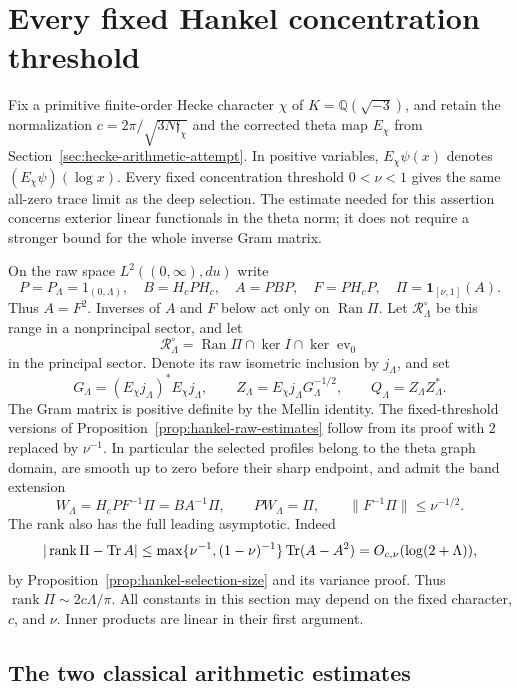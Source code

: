 \section{Every fixed Hankel concentration threshold}
\label{nh:section}

Fix a primitive finite-order Hecke character $\chi$ of
$K=\mathbb Q(\sqrt{-3})$, and retain the normalization
$c=2\pi/\sqrt{3N\mathfrak f_\chi}$ and the corrected theta map
$E_\chi$ from Section~\ref{sec:hecke-arithmetic-attempt}.
In positive variables, $E_\chi\psi(x)$ denotes
$(E_\chi\psi)(\log x)$.
Every fixed concentration threshold $0<\nu<1$ gives the same
all-zero trace limit as the deep selection. The estimate needed
for this assertion concerns exterior linear functionals in the
theta norm; it does not require a stronger bound for the whole
inverse Gram matrix.

On the raw space $L^2((0,\infty),du)$ write
\[
 P=P_\Lambda=1_{(0,\Lambda)},\quad
 B=H_cPH_c,\quad A=PBP,\quad F=PH_cP,\quad
 \Pi=\mathbf1_{[\nu,1]}(A).
\]
Thus $A=F^2$. Inverses of $A$ and $F$ below act only on
$\operatorname{Ran}\Pi$. Let $\mathcal R_\Lambda^\circ$ be this
range in a nonprincipal sector, and let
\[
 \mathcal R_\Lambda^\circ
 =\operatorname{Ran}\Pi\cap\ker I\cap\ker\operatorname{ev}_0
\]
in the principal sector. Denote its raw isometric inclusion by
$j_\Lambda$, and set
\[
 G_\Lambda=(E_\chi j_\Lambda)^*E_\chi j_\Lambda,\qquad
 Z_\Lambda=E_\chi j_\Lambda G_\Lambda^{-1/2},\qquad
 Q_\Lambda=Z_\Lambda Z_\Lambda^*.
\]
The Gram matrix is positive definite by the Mellin identity.
The fixed-threshold versions of
Proposition~\ref{prop:hankel-raw-estimates} follow from its proof
with $2$ replaced by $\nu^{-1}$. In particular the selected
profiles belong to the theta graph domain, are smooth up to zero
before their sharp endpoint, and admit the band extension
\begin{equation}\label{nh:extension}
 W_\Lambda=H_cPF^{-1}\Pi=BA^{-1}\Pi,\qquad
 PW_\Lambda=\Pi,\qquad \|F^{-1}\Pi\|\leq\nu^{-1/2}.
\end{equation}
The rank also has the full leading asymptotic. Indeed
\[
 |\operatorname{rank}\Pi-\operatorname{Tr} A|
 \leq\max\{\nu^{-1},(1-\nu)^{-1}\}\operatorname{Tr}(A-A^2)
 =O_{c,\nu}(\log(2+\Lambda)),
\]
by Proposition~\ref{prop:hankel-selection-size} and its variance proof.
Thus $\operatorname{rank}\Pi\sim2c\Lambda/\pi$.
All constants in this section may depend on the fixed character,
$c$, and $\nu$. Inner products are linear in their first argument.

\subsection{The two classical arithmetic estimates}

